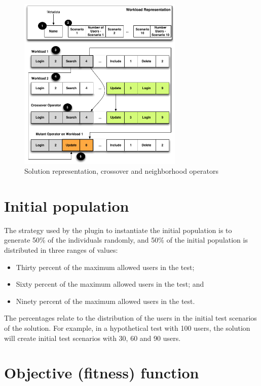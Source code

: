 \documentclass{report}
\begin{document}
\begin{figure}[h]
\centering
\includegraphics[width=0.7\textwidth]{./images/genomere.png}
\caption{Solution representation, crossover  and neighborhood operators \cite{Gois2016}}
\label{fig:solution}
\end{figure}

\section{Initial population}

The strategy used by the plugin to instantiate the initial population is to generate 50\% of the individuals randomly, and 50\% of the initial population is distributed in three ranges of values:

\begin{itemize}
\item Thirty percent of the maximum allowed users in the test;
\item Sixty percent of the maximum allowed users in the test; and
\item Ninety percent of the maximum allowed users in the test.
\end{itemize}

The percentages relate to the distribution of the users in the initial test scenarios of the solution. For example, in a hypothetical test with 100 users, the solution will create initial test scenarios with 30, 60 and 90 users.

\section{Objective (fitness) function}
\end{document}
